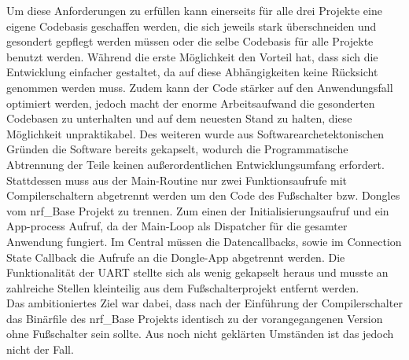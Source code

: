 Um diese Anforderungen zu erfüllen kann einerseits für alle drei Projekte eine eigene Codebasis geschaffen werden, die sich jeweils stark überschneiden und gesondert gepflegt werden müssen oder die selbe Codebasis für alle Projekte benutzt werden. Während die erste Möglichkeit den Vorteil hat, dass sich die Entwicklung einfacher gestaltet, da auf diese Abhängigkeiten keine Rücksicht genommen werden muss. Zudem kann der Code stärker auf den Anwendungsfall optimiert werden, jedoch macht der enorme Arbeitsaufwand die gesonderten Codebasen zu unterhalten und auf dem neuesten Stand zu halten, diese Möglichkeit unpraktikabel. Des weiteren wurde aus Softwarearchetektonischen Gründen die Software bereits gekapselt, wodurch die Programmatische Abtrennung der Teile keinen außerordentlichen Entwicklungsumfang erfordert.\\
Stattdessen muss aus der Main-Routine nur zwei Funktionsaufrufe mit Compilerschaltern abgetrennt werden um den Code des Fußschalter bzw. Dongles vom nrf\_Base Projekt zu trennen. Zum einen der Initialisierungsaufruf und ein App-process Aufruf, da der Main-Loop als Dispatcher für die gesamter Anwendung fungiert. Im Central müssen die Datencallbacks, sowie im Connection State Callback die Aufrufe an die Dongle-App abgetrennt werden. Die Funktionalität der UART stellte sich als wenig gekapselt heraus und musste an zahlreiche Stellen kleinteilig aus dem Fußschalterprojekt entfernt werden.\\ 
Das ambitioniertes Ziel war dabei, dass nach der Einführung der Compilerschalter das Binärfile des nrf\_Base Projekts identisch zu der vorangegangenen Version ohne Fußschalter sein sollte. Aus noch nicht geklärten Umständen ist das jedoch nicht der Fall.


